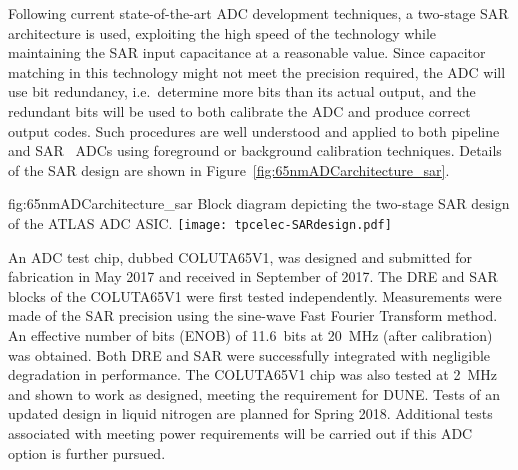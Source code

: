 Following current state-of-the-art ADC development techniques, a two-stage 
SAR architecture is used, exploiting the high speed of the technology while maintaining the SAR input 
capacitance at a reasonable value. Since capacitor matching in this technology might not meet the 
precision required, the ADC will use bit redundancy, i.e.~determine more bits than its actual output, 
and the redundant bits will be used to both calibrate the ADC and produce correct output codes. 
Such procedures are well understood and applied to both pipeline~\cite{Kuppambatti:2013nfa} and 
SAR~\cite{5999734} ADCs using foreground or background calibration techniques. Details of the SAR design are shown in Figure~\ref{fig:65nmADCarchitecture_sar}. 

\begin{dunefigure}
{fig:65nmADCarchitecture_sar}
{Block diagram depicting the two-stage SAR design of the ATLAS ADC ASIC.}
\texttt{[image: tpcelec-SARdesign.pdf]}
\end{dunefigure}

An ADC test chip, dubbed COLUTA65V1, was designed and submitted for fabrication in May 2017 and received
in September of 2017.  The DRE and SAR blocks of the COLUTA65V1 were first tested independently. Measurements were made of the SAR precision using the sine-wave Fast Fourier Transform method. An effective number of bits
(ENOB) of \SI{11.6}{bits} at \SI{20}{MHz} (after calibration) was obtained.
Both DRE and SAR were successfully integrated with negligible degradation in performance. The COLUTA65V1 chip was also tested at 2~MHz and shown to work as designed, meeting the requirement for DUNE. Tests of an updated design in liquid nitrogen are planned for Spring 2018. Additional tests associated with meeting power requirements will be carried out if this ADC option is further pursued.
